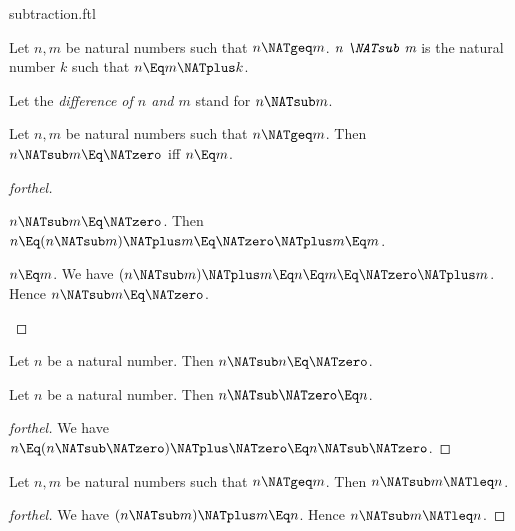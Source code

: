 \documentclass{stex}
\begin{document}
\begin{smodule}{subtraction.ftl}

\begin{definition}[forthel,id=ARITHMETIC_05_8878757276286976]
  Let $n, m$ be natural numbers such that $n \NATgeq m$.
  $\emph{n \NATsub m}$ is the natural number $k$ such that $n \Eq m \NATplus k$.

  Let the \emph{difference of $n$ and $m$} stand for $n \NATsub m$.
\end{definition}

\begin{proposition}[forthel,id=ARITHMETIC_05_874271710642176]
  Let $n, m$ be natural numbers such that $n \NATgeq m$.
  Then $n \NATsub m \Eq \NATzero$ iff $n \Eq m$.
\end{proposition}
\begin{proof}[forthel]
  \begin{case}{$n \NATsub m \Eq \NATzero$.}
    Then $n
      \Eq (n \NATsub m) \NATplus m
      \Eq \NATzero \NATplus m
      \Eq m$.
  \end{case}

  \begin{case}{$n \Eq m$.}
    We have $(n \NATsub m) \NATplus m
      \Eq n
      \Eq m
      \Eq \NATzero \NATplus m$.
    Hence $n \NATsub m \Eq \NATzero$.
  \end{case}
\end{proof}

\begin{corollary}[forthel,id=ARITHMETIC_05_8457713057005568]
  Let $n$ be a natural number.
  Then $n \NATsub n \Eq \NATzero$.
\end{corollary}

\begin{proposition}[forthel,id=ARITHMETIC_05_8518521570983936]
  Let $n$ be a natural number.
  Then $n \NATsub \NATzero \Eq n$.
\end{proposition}
\begin{proof}[forthel]
  We have $n
    \Eq (n \NATsub \NATzero) \NATplus \NATzero
    \Eq n \NATsub \NATzero$.
\end{proof}

\begin{proposition}[forthel,id=ARITHMETIC_05_4222566117933056]
  Let $n, m$ be natural numbers such that $n \NATgeq m$.
  Then $n \NATsub m \NATleq n$.
\end{proposition}
\begin{proof}[forthel]
  We have $(n \NATsub m) \NATplus m \Eq n$.
  Hence $n \NATsub m \NATleq n$.
\end{proof}


\end{smodule}
\end{document}
